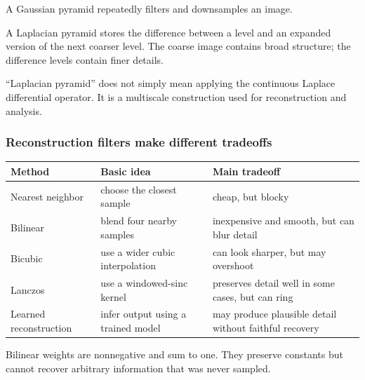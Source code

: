 A Gaussian pyramid repeatedly filters and downsamples an image.

A Laplacian pyramid stores the difference between a level and an expanded version of the next coarser level. The coarse image contains broad structure; the difference levels contain finer details.

``Laplacian pyramid'' does not simply mean applying the continuous Laplace differential operator. It is a multiscale construction used for reconstruction and analysis.

\subsubsection{Reconstruction filters make different tradeoffs}\label{04-visual-computing-ii-ch043-reconstruction-filters-make-different-tradeoffs}

{\def\LTcaptype{none} %
\begin{longtable}[]{@{}
  >{\raggedright\arraybackslash}p{}
  >{\raggedright\arraybackslash}p{}
  >{\raggedright\arraybackslash}p{}@{}}
\toprule\noalign{}
\begin{minipage}[b]{\linewidth}\raggedright
Method
\end{minipage} & \begin{minipage}[b]{\linewidth}\raggedright
Basic idea
\end{minipage} & \begin{minipage}[b]{\linewidth}\raggedright
Main tradeoff
\end{minipage} \\
\midrule\noalign{}
\endhead
\bottomrule\noalign{}
\endlastfoot
Nearest neighbor & choose the closest sample & cheap, but blocky \\
Bilinear & blend four nearby samples & inexpensive and smooth, but can blur detail \\
Bicubic & use a wider cubic interpolation & can look sharper, but may overshoot \\
Lanczos & use a windowed-sinc kernel & preserves detail well in some cases, but can ring \\
Learned reconstruction & infer output using a trained model & may produce plausible detail without faithful recovery \\
\end{longtable}
}

Bilinear weights are nonnegative and sum to one. They preserve constants but cannot recover arbitrary information that was never sampled.

